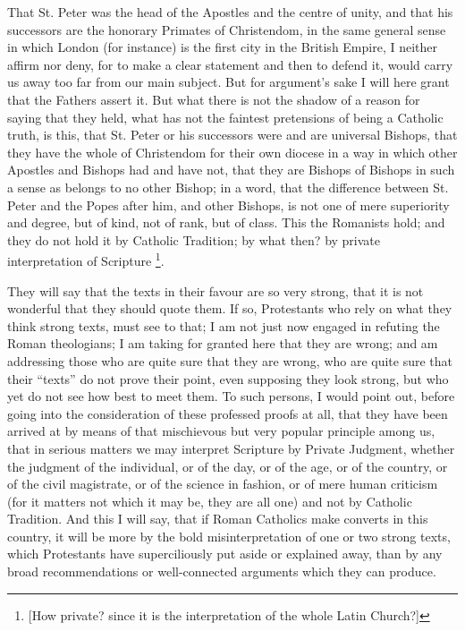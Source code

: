That St. Peter was the head of the Apostles and the centre of
unity, and that his successors are the honorary Primates of
Christendom, in the same general sense in which London (for instance)
is the first city in the British Empire, I neither affirm nor deny,
for to make a clear statement and then to defend it, would carry
us away too far from our main subject. But for argument's sake I will
here grant that the Fathers assert it. But what there is not the
shadow of a reason for saying that they held, what has not the
faintest pretensions of being a Catholic truth, is this, that St.
Peter or his successors were and are universal Bishops, that they have
the whole of Christendom for their own diocese in a way in which other
Apostles and Bishops had and have not, that they are Bishops of
Bishops in such a sense as belongs to no other Bishop; in a word, that
the difference between St. Peter and the Popes after him, and other
Bishops, is not one of mere superiority and degree, but of kind, not
of rank, but of class. This the Romanists hold; and they do not hold
it by Catholic Tradition; by what then? by private interpretation of
Scripture \footnote{[How private? since it is the
interpretation of the whole Latin Church?]}.

They will say that the texts in their favour are so very strong,
that it is not wonderful that they should quote them. If so,
Protestants who rely on what they think strong texts, must see to
that; I am not just now engaged in refuting the Roman theologians; I
am taking for granted here that they are wrong; and am addressing
those who are quite sure that they are wrong, who are quite sure that
their ``texts'' do not prove their point, even supposing they
look strong, but who yet do not see how best to meet them. To such
persons, I would point out, before going into the consideration of
these professed proofs at all, that they have been arrived at by means
of that mischievous but very popular principle among us, that in
serious matters we may interpret Scripture by Private Judgment,
whether the judgment of the individual, or of the day, or of the age,
or of the country, or of the civil magistrate, or of the science in
fashion, or of mere human criticism (for it matters not which it
may be, they are all one) and not by Catholic Tradition. And this I
will say, that if Roman Catholics make converts in this country, it
will be more by the bold misinterpretation of one or two strong texts,
which Protestants have superciliously put aside or explained away,
than by any broad recommendations or well-connected arguments which
they can produce.

